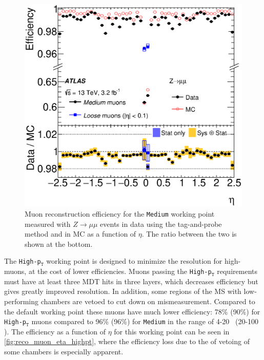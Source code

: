 \begin{centering}
\begin{figure}[!hbt]
\myfloatalign
\includegraphics[width=.9\linewidth]{figures/reco/fig_03a.eps}
\caption{Muon reconstruction efficiency for the \texttt{Medium} working point measured with $Z\rightarrow\mu\mu$ events in data using the tag-and-probe method and in \ac{MC} as a function of $\eta$. The ratio between the two is shown at the bottom. \cite{1603.05598} }
\label{fig:reco_muon_eta}
\end{figure}
\end{centering}

The \texttt{High-p$_\texttt{T}$} working point is designed to minimize the resolution for high-\pt muons, at the cost of lower efficiencies. Muons passing the \texttt{High-p$_\texttt{T}$} requirements must have at least three \ac{MDT} hits in three layers, which decreases efficiency but gives greatly improved \pt resolution. In addition, some regions of the \ac{MS} with low-performing chambers are vetoed to cut down on mismeasurement. Compared to the default working point these muons have much lower efficiency: 78\% (90\%) for \texttt{High-p$_\texttt{T}$} muons compared to 96\% (96\%) for \texttt{Medium} in the \pt range of 4-20 \gev~(20-100 \gev). The efficiency as a function of $\eta$ for this working point can be seen in \autoref{fig:reco_muon_eta_highpt}, where the efficiency loss due to the of vetoing of some chambers is especially apparent.

